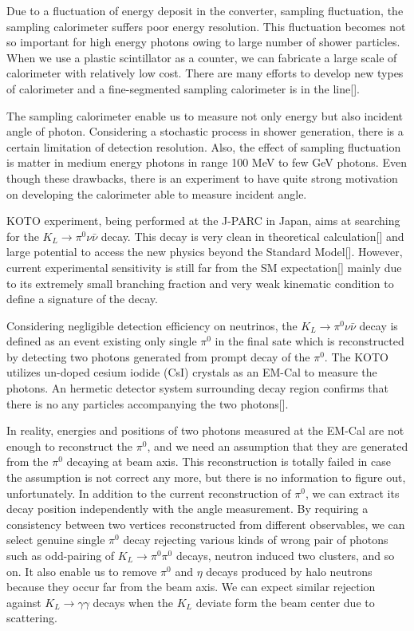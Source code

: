\documentclass[jkps,preprint,fleqn,showpacs,showkeys]{revtex4}
\begin{document}
Due to a fluctuation of energy deposit in the converter, sampling fluctuation, the sampling calorimeter suffers poor energy resolution. This fluctuation becomes not so important for high energy photons owing to large number of shower particles. When we use a plastic scintillator as a counter, we can fabricate a large scale of calorimeter with relatively low cost.  
There are many efforts to develop new types of calorimeter and a fine-segmented sampling calorimeter is in the line[]. 

The sampling calorimeter enable us to measure not only energy but also incident angle of photon. Considering a stochastic process in shower generation, there is a certain limitation of detection resolution. Also, the effect of sampling fluctuation is matter in medium energy photons in range 100 MeV to few GeV photons. Even though these drawbacks, there is an experiment to have quite strong motivation on developing the calorimeter able to measure incident angle.

KOTO experiment, being performed at the J-PARC in Japan, aims at searching for the $K_L \rightarrow \pi^0 \nu \bar{\nu}$ decay.  This decay is very clean in theoretical calculation[] and large potential to access the new physics beyond the Standard Model[]. However, current experimental sensitivity is still far from the SM expectation[] mainly due to its extremely small branching fraction and very weak kinematic condition to define a signature of the decay. 

Considering negligible detection efficiency on neutrinos, the $K_L \rightarrow \pi^0 \nu \bar{\nu}$ decay is defined as an event existing only single $\pi^0$ in the final sate which is reconstructed by detecting two photons generated from prompt decay of the $\pi^0$. The KOTO utilizes un-doped cesium iodide (CsI) crystals as an EM-Cal to measure the photons. An hermetic detector system surrounding decay region confirms that there is no any particles accompanying the two photons[]. 

In reality, energies and positions of two photons measured at the EM-Cal are not enough to reconstruct the $\pi^0$, and we need an assumption that they are generated from the $\pi^0$ decaying at beam axis. This reconstruction is totally failed in case the assumption is not correct any more, but there is no information to figure out, unfortunately. 
 In addition to the current reconstruction of $\pi^0$, we can extract its decay position independently with the angle measurement. By requiring a consistency between two vertices reconstructed from different observables, we can select genuine single $\pi^0$ decay rejecting various kinds of wrong pair of photons such as odd-pairing of $K_L \rightarrow \pi^0 \pi^0$ decays, neutron induced two clusters, and so on. It also enable us to remove $\pi^0$ and $\eta$ decays produced by halo neutrons because they occur far from the beam axis. We can expect similar rejection against $K_L \rightarrow \gamma \gamma$ decays when the $K_L$ deviate form the beam center due to scattering. 
\end{document}
